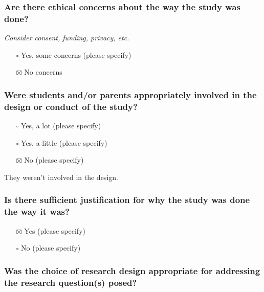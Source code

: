 \documentclass[
  doc, a4paper]{apa7}
\providecommand{\tightlist}{%
  \setlength{\itemsep}{0pt}\setlength{\parskip}{0pt}}
\begin{document}
\subsubsection{Are there ethical concerns about the way the study was done?}\label{are-there-ethical-concerns-about-the-way-the-study-was-done}

\emph{Consider consent, funding, privacy, etc.}

\begin{itemize}
\tightlist
\item[$\square$]
  Yes, some concerns (please specify)
\item[$\boxtimes$]
  No concerns
\end{itemize}

\subsubsection{Were students and/or parents appropriately involved in the design or conduct of the study?}\label{were-students-andor-parents-appropriately-involved-in-the-design-or-conduct-of-the-study}

\begin{itemize}
\tightlist
\item[$\square$]
  Yes, a lot (please specify)
\item[$\square$]
  Yes, a little (please specify)
\item[$\boxtimes$]
  No (please specify)
\end{itemize}

They weren't involved in the design.

\subsubsection{Is there sufficient justification for why the study was done the way it was?}\label{is-there-sufficient-justification-for-why-the-study-was-done-the-way-it-was}

\begin{itemize}
\tightlist
\item[$\boxtimes$]
  Yes (please specify)
\item[$\square$]
  No (please specify)
\end{itemize}

\subsubsection{Was the choice of research design appropriate for addressing the research question(s) posed?}\label{was-the-choice-of-research-design-appropriate-for-addressing-the-research-questions-posed}
\end{document}
